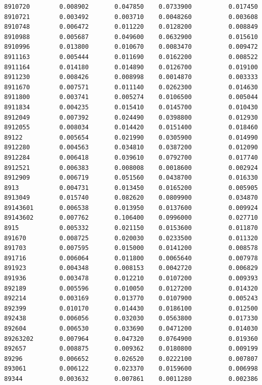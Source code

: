 \documentclass[
  letterpaper,
  DIV=11,
  numbers=noendperiod]{scrartcl}
\begin{document}
\begin{verbatim}
8910720        0.008902       0.047850    0.0733900          0.017450
8910721        0.003492       0.003710    0.0048260          0.003608
8910748        0.006472       0.011220    0.0128200          0.008849
8910988        0.005687       0.049600    0.0632900          0.015610
8910996        0.013800       0.010670    0.0083470          0.009472
8911163        0.005444       0.011690    0.0162200          0.008522
8911164        0.014180       0.014890    0.0126700          0.019100
8911230        0.008426       0.008998    0.0014870          0.003333
8911670        0.007571       0.011140    0.0262300          0.014630
8911800        0.003741       0.005274    0.0106500          0.005044
8911834        0.004235       0.015410    0.0145700          0.010430
8912049        0.007392       0.024490    0.0398800          0.012930
8912055        0.008034       0.014420    0.0151400          0.018460
89122          0.005654       0.021990    0.0305900          0.014990
8912280        0.004563       0.034810    0.0387200          0.012090
8912284        0.006418       0.039610    0.0792700          0.017740
8912521        0.006383       0.008008    0.0018600          0.002924
8912909        0.006719       0.051560    0.0438700          0.016330
8913           0.004731       0.013450    0.0165200          0.005905
8913049        0.015740       0.082620    0.0809900          0.034870
89143601       0.006538       0.013950    0.0137600          0.009924
89143602       0.007762       0.106400    0.0996000          0.027710
8915           0.005332       0.021150    0.0153600          0.011870
891670         0.008725       0.020030    0.0233500          0.011320
891703         0.007595       0.015000    0.0141200          0.008578
891716         0.006064       0.011800    0.0065640          0.007978
891923         0.004348       0.008153    0.0042720          0.006829
891936         0.003478       0.012210    0.0107200          0.009393
892189         0.005596       0.010050    0.0127200          0.014320
892214         0.003169       0.013770    0.0107900          0.005243
892399         0.010170       0.014430    0.0186100          0.012500
892438         0.006056       0.032030    0.0563800          0.017330
892604         0.006530       0.033690    0.0471200          0.014030
89263202       0.007964       0.047320    0.0764900          0.019360
892657         0.008875       0.009362    0.0180800          0.009199
89296          0.006652       0.026520    0.0222100          0.007807
893061         0.006122       0.023370    0.0159600          0.006998
89344          0.003632       0.007861    0.0011280          0.002386

\end{verbatim}
\end{document}
